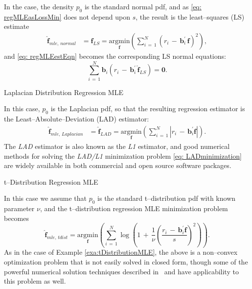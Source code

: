 \documentclass[graybox,envcountchap,sectrefs]{svmono}\usepackage[]{graphicx}\usepackage[]{xcolor}
\begin{document}
\begin{appendices}
\begin{example}
In the case, the density $p_{0}$ is the standard normal pdf, and
as \eqref{eq: regMLEasLossMin} does not depend upon $s$, the result
is the least--squares (LS) estimate
\begin{align}
\hat{\mathbf{f}}_{mle,\,normal} & =\hat{\mathbf{f}}_{LS}=\underset{\mathbf{f}}{\mathrm{argmin}}\left(\sum_{i\,=\,1}^{N}(r_{i}\,-\,\mathbf{b}_{i}^{\prime}\,\mathbf{f})^{2}\right),\label{eq: LSminimization}
\end{align}
and \eqref{eq: regMLEestEqn} becomes the corresponding LS normal
equations:
\begin{equation}
\sum_{i\,=\,1}^{N}\mathbf{b}_{i}\left(r_{i}\,-\,\mathbf{b}_{i}^{\prime}\,\hat{\mathbf{f}}_{LS}\right)=\mathbf{0}.\label{eq: LSnormalEqns}
\end{equation}

Laplacian Distribution Regression MLE

In this case, $p_{0}$ is the Laplacian pdf, so that the resulting
regression estimator is the Least--Absolute--Deviation (LAD) estimator:
\begin{align}
\hat{\mathbf{f}}_{mle,\,Laplacian} & =\hat{\mathbf{f}}_{LAD}=\underset{\mathbf{f}}{\mathrm{argmin}}\left(\sum_{i\,=\,1}^{N}|r_{i}\,-\,\mathbf{b}_{i}^{\prime}\mathbf{f}|\right).\label{eq: LADminimization}
\end{align}
The \emph{LAD} estimator is also known as the \emph{L1} estimator,
and good numerical methods for solving the \emph{LAD/L1} minimization
problem \eqref{eq: LADminimization} are widely available in both
commercial and open source software packages.

t--Distribution Regression MLE

In this case we assume that $p_{0}$ is the standard t--distribution
pdf with known parameter $\nu$, and the t--distribution regression
MLE minimization problem becomes
\begin{equation}
\hat{\mathbf{f}}_{mle,\,tdist}=\underset{\mathbf{f}}{\mathrm{argmin}}\left(\sum_{i\,=\,1}^{N}\log\left(1\,+\,\dfrac{1}{\nu}\left(\frac{r_{i}\,-\,\mathbf{b}_{i}^{\prime}\mathbf{f}}{s}\right)^{2}\right)\right).
\end{equation}
As in the case of Example \eqref{exa:tDistributionMLE}, the above
is a non--convex optimization problem that is not easily solved in
closed form, though some of the powerful numerical solution techniques
described in \RobustMethodsChapter\ and \citet{AzzaliniCapitanio2014}
have applicability to this problem as well.
\end{example}


\end{appendices}
\end{document}
